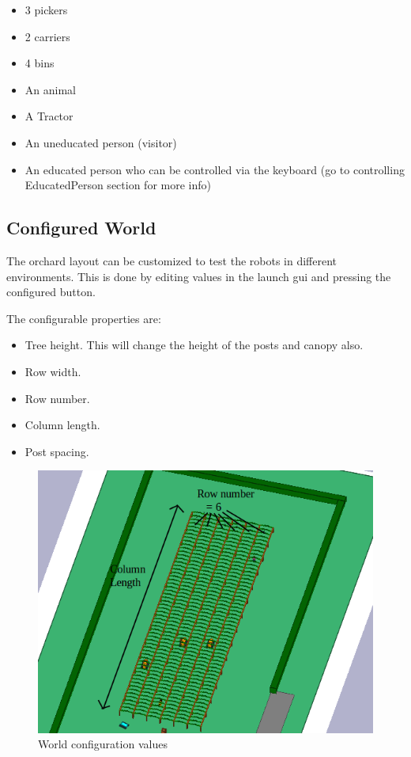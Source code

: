 \documentclass{article}
\begin{document}
\begin{itemize}
\item 3 pickers
\item 2 carriers
\item 4 bins
\item An animal
\item A Tractor
\item An uneducated person (visitor)
\item An educated person who can be controlled via the keyboard (go to controlling EducatedPerson section for more info)
\end{itemize}

\subsection{Configured World}

The orchard layout can be customized to test the robots in different environments.
This is done by editing values in the launch gui and pressing the configured button.


The configurable properties are:
\begin{itemize}
\item Tree height. This will change the height of the posts and canopy also.
\item Row width.
\item Row number.
\item Column length.
\item Post spacing.
\end{itemize}

\begin{figure}[ht]\centering
\includegraphics[scale=0.65]{config1}
\caption{World configuration values}
\label{fig:results}
\end{figure}
\end{document}
